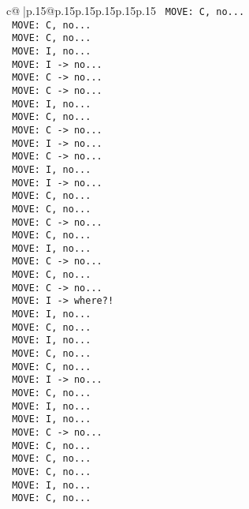 \documentclass{article}
\begin{document}
{\begin{supertabular}{c@{$\;$}|p{.15\linewidth}@{}p{.15\linewidth}p{.15\linewidth}p{.15\linewidth}p{.15\linewidth}p{.15\linewidth}}
{{{\texttt{ MOVE: C, no...} \\
\texttt{ MOVE: C, no...} \\
\texttt{ MOVE: C, no...} \\
\texttt{ MOVE: I, no...} \\
\texttt{ MOVE: I {-}> no...} \\
\texttt{ MOVE: C {-}> no...} \\
\texttt{ MOVE: C {-}> no...} \\
\texttt{ MOVE: I, no...} \\
\texttt{ MOVE: C, no...} \\
\texttt{ MOVE: C {-}> no...} \\
\texttt{ MOVE: I {-}> no...} \\
\texttt{ MOVE: C {-}> no...} \\
\texttt{ MOVE: I, no...} \\
\texttt{ MOVE: I {-}> no...} \\
\texttt{ MOVE: C, no...} \\
\texttt{ MOVE: C, no...} \\
\texttt{ MOVE: C {-}> no...} \\
\texttt{ MOVE: C, no...} \\
\texttt{ MOVE: I, no...} \\
\texttt{ MOVE: C {-}> no...} \\
\texttt{ MOVE: C, no...} \\
\texttt{ MOVE: C {-}> no...} \\
\texttt{ MOVE: I {-}> where?!} \\
\texttt{ MOVE: I, no...} \\
\texttt{ MOVE: C, no...} \\
\texttt{ MOVE: I, no...} \\
\texttt{ MOVE: C, no...} \\
\texttt{ MOVE: C, no...} \\
\texttt{ MOVE: I {-}> no...} \\
\texttt{ MOVE: C, no...} \\
\texttt{ MOVE: I, no...} \\
\texttt{ MOVE: I, no...} \\
\texttt{ MOVE: C {-}> no...} \\
\texttt{ MOVE: C, no...} \\
\texttt{ MOVE: C, no...} \\
\texttt{ MOVE: C, no...} \\
\texttt{ MOVE: I, no...} \\
\texttt{ MOVE: C, no...} \\
}}}
\end{supertabular}}
\end{document}
